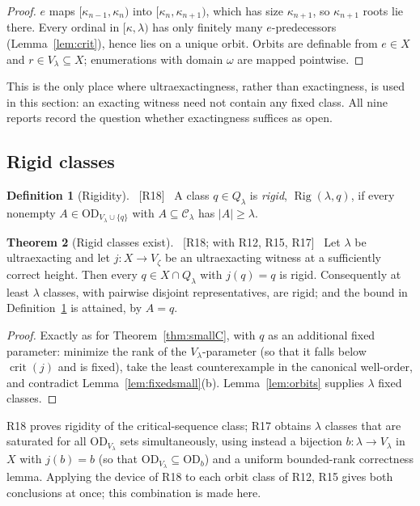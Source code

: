 \documentclass[11pt,letterpaper]{article}
\theoremstyle{definition}
\newtheorem{definition}{Definition}[section]
\newtheorem{theorem}[definition]{Theorem}
\numberwithin{equation}{section}
\newcommand{\OD}{\mathrm{OD}}
\newcommand{\crit}{\operatorname{crit}}
\newcommand{\Clam}{\mathcal C_\lambda}
\newcommand{\Rig}{\operatorname{Rig}}
\newcommand{\src}[1]{\unskip\ {\normalfont\small\sffamily\color{Olive}[#1]}\ }
\newcommand{\R}[1]{\textsf{R#1}}
\begin{document}
\begin{proof}
$e$ maps $[\kappa_{n-1},\kappa_n)$ into $[\kappa_n,\kappa_{n+1})$, which has size $\kappa_{n+1}$, so $\kappa_{n+1}$ roots lie there. Every ordinal in $[\kappa,\lambda)$ has only finitely many $e$-predecessors (Lemma~\ref{lem:crit}), hence lies on a unique orbit. Orbits are definable from $e\in X$ and $r\in V_\lambda\subseteq X$; enumerations with domain $\omega$ are mapped pointwise.
\end{proof}

This is the only place where ultraexactingness, rather than exactingness, is used in this section: an exacting witness need not contain any fixed class. All nine reports record the question whether exactingness suffices as open.

\subsection{Rigid classes}

\begin{definition}[Rigidity]\label{def:rigid}\src{R18}
A class $q\in Q_\lambda$ is \emph{rigid}, $\Rig(\lambda,q)$, if every nonempty $A\in\OD_{V_\lambda\cup\{q\}}$ with $A\subseteq\Clam$ has $|A|\ge\lambda$.
\end{definition}

\begin{theorem}[Rigid classes exist]\label{thm:rigid}\src{R18; with R12, R15, R17}
Let $\lambda$ be ultraexacting and let $j:X\to V_\zeta$ be an ultraexacting witness at a sufficiently correct height. Then every $q\in X\cap Q_\lambda$ with $j(q)=q$ is rigid. Consequently at least $\lambda$ classes, with pairwise disjoint representatives, are rigid; and the bound in Definition~\ref{def:rigid} is attained, by $A=q$.
\end{theorem}

\begin{proof}
Exactly as for Theorem~\ref{thm:smallC}, with $q$ as an additional fixed parameter: minimize the rank of the $V_\lambda$-parameter (so that it falls below $\crit(j)$ and is fixed), take the least counterexample in the canonical well-order, and contradict Lemma~\ref{lem:fixedsmall}(b). Lemma~\ref{lem:orbits} supplies $\lambda$ fixed classes.
\end{proof}

\R{18} proves rigidity of the critical-sequence class; \R{17} obtains $\lambda$ classes that are saturated for all $\OD_{V_\lambda}$ sets simultaneously, using instead a bijection $b:\lambda\to V_\lambda$ in $X$ with $j(b)=b$ (so that $\OD_{V_\lambda}\subseteq\OD_b$) and a uniform bounded-rank correctness lemma. Applying the device of \R{18} to each orbit class of \R{12}, \R{15} gives both conclusions at once; this combination is made here.
\end{document}
